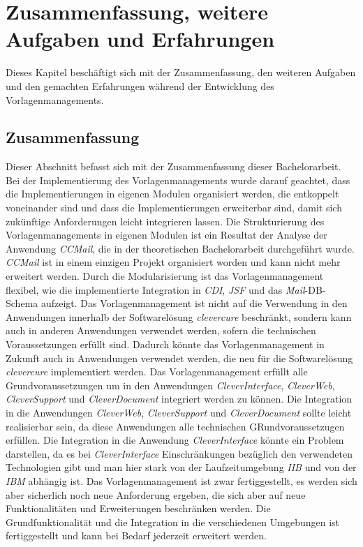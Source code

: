 \chapter{Zusammenfassung, weitere Aufgaben und Erfahrungen}
\label{cha:Zusammenfassung}
Dieses Kapitel beschäftigt sich mit der Zusammenfassung, den weiteren Aufgaben und den gemachten Erfahrungen während der Entwicklung des Vorlagenmanagements. 
\section{Zusammenfassung}
Dieser Abschnitt befasst sich mit der Zusammenfassung dieser Bachelorarbeit.
\newline
\newline
Bei der Implementierung des Vorlagenmanagements wurde darauf geachtet, dass die Implementierungen in eigenen Modulen organisiert werden, die entkoppelt voneinander sind und dass die Implementierungen erweiterbar sind, damit sich zukünftige Anforderungen leicht integrieren lassen. Die Strukturierung des Vorlagenmanagements  in eigenen Modulen ist ein Resultat der Analyse der Anwendung \emph{CCMail}, die in der theoretischen Bachelorarbeit durchgeführt wurde. \emph{CCMail} ist in einem einzigen Projekt organisiert worden und kann nicht mehr erweitert werden. Durch die Modularisierung ist das Vorlagenmanagement flexibel, wie die implementierte Integration in \emph{CDI}, \emph{JSF} und das \emph{Mail}-DB-Schema aufzeigt.
\newline
\newline
Das Vorlagenmanagement ist nicht auf die Verwendung in den Anwendungen innerhalb der Softwarelösung \emph{clevercure} beschränkt, sondern kann auch in anderen Anwendungen verwendet werden, sofern die technischen Voraussetzungen erfüllt sind. Dadurch könnte das Vorlagenmanagement in Zukunft auch in Anwendungen verwendet werden, die neu für die Softwarelösung \emph{clevercure} implementiert werden. 
\newline
\newline
Das Vorlagenmanagement erfüllt alle Grundvoraussetzungen um in den Anwendungen \emph{CleverInterface}, \emph{CleverWeb}, \emph{CleverSupport} und \emph{CleverDocument} integriert werden zu können. Die Integration in die Anwendungen \emph{CleverWeb}, \emph{CleverSupport} und \emph{CleverDocument} sollte leicht realisierbar sein, da diese Anwendungen alle technischen GRundvoraussetzugen erfüllen. Die Integration in die Anwendung \emph{CleverInterface} könnte ein Problem darstellen, da es bei \emph{CleverInterface} Einschränkungen bezüglich den verwendeten Technologien gibt und man hier stark von der Laufzeitumgebung \emph{IIB} und von der \emph{IBM} abhängig ist.  
\newline
\newline
Das Vorlagenmanagement ist zwar fertiggestellt, es werden sich aber sicherlich noch neue Anforderung ergeben, die sich aber auf neue Funktionalitäten und Erweiterungen beschränken werden. Die Grundfunktionalität und die Integration in die verschiedenen Umgebungen ist fertiggestellt und kann bei Bedarf jederzeit erweitert werden.

